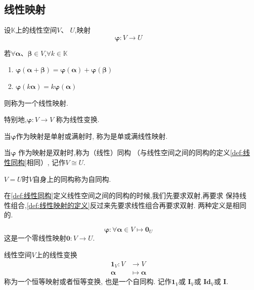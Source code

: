 \subsection{线性映射}
\begin{formal}
\begin{definition}[线性映射的定义]\label{def:线性映射的定义}
    设$\mathbb{K}$上的线性空间$V$、
    $U$,映射\[
    \bm{\varphi }:V \longrightarrow
    U
    \]

    若$\forall \bm{\alpha}$、$\bm{\beta} \in V$,$\forall k \in \mathbb{K}$
    \begin{enumerate}[label=\textup{(\arabic*)}]
        \item $\bm{\varphi}\left(
            \bm{\alpha}+\bm{\beta}
        \right)=\bm{\varphi}\left(
            \bm{\alpha}
        \right)   +
        \bm{\varphi}\left(
            \bm{\beta}
        \right)$
        \item $\bm{\varphi}\left(k\bm{\alpha}
        \right)=k\bm{\varphi}\left(
            \bm{\alpha}
        \right)$
    \end{enumerate}
    则称为一个线性映射.

    特别地,$\bm{\varphi}:V
    \longrightarrow V$
    称为线性变换.

    当$\bm{\varphi}$作为映射是单射或满射时,
    称为是单或满线性映射.
    
    当$
    \bm{\varphi}$
    作为映射是双射时,称为（线性）同构
    （与线性空间之间的同构的定义\cref{def:线性同构}相同）,
    记作$V\cong U$.
    
    $V=U$时$V$自身上的同构称为自同构.
\end{definition}
\end{formal}
\begin{red}
\begin{remark}
    在\cref{def:线性同构}定义线性空间之间的同构的时候,我们先要求双射,再要求
    保持线性组合,\cref{def:线性映射的定义}反过来先要求线性组合再要求双射.
    两种定义是相同的.
\end{remark}
\end{red}
\begin{brown}
\begin{example}
    \[
    \bm{\varphi}:
    \forall \bm{\alpha}\in V
    \longmapsto \bm{0}_U
    \]
    这是一个零线性映射$\bm{0}:V\longrightarrow U.$
\end{example}
\end{brown}
\begin{brown}
\begin{example}
    线性空间$V$上的线性变换
    \begin{align*}
        \bm{1}_V:
        V &\longrightarrow V\\
        \bm{\alpha} & \longmapsto 
        \bm{\alpha}
    \end{align*}
    称为一个恒等映射或者恒等变换,
    也是一个自同构.
    记作$\bm{1}_V$或
    $\bm{I}_V$或
    $\mathbf{Id}_V$或
    $\bm{I}$.
\end{example}
\end{brown}
